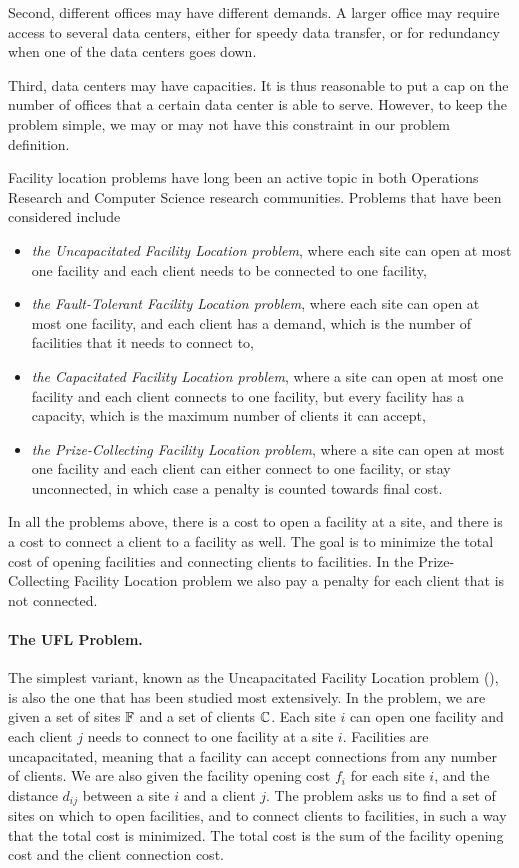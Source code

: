 \documentclass[oneside,final]{ucr}
\begin{document}
Second, different offices may have different demands. A
larger office may require access to several data centers,
either for speedy data transfer, or for redundancy when one
of the data centers goes down.

Third, data centers may have capacities. It is thus
reasonable to put a cap on the number of offices that a
certain data center is able to serve. However, to keep the
problem simple, we may or may not have this constraint in
our problem definition.

Facility location problems have long been an active topic in
both Operations Research and Computer Science research
communities. Problems that have been considered include
\begin{itemize}
\item \emph{the Uncapacitated Facility Location problem}, where
  each site can open at most one facility and each client
  needs to be connected to one facility,
\item \emph{the Fault-Tolerant Facility Location problem},
  where each site can open at most one facility, and each
  client has a demand, which is the number of facilities
  that it needs to connect to,
\item \emph{the Capacitated Facility Location problem},
  where a site can open at most one facility and each client
  connects to one facility, but every facility has a
  capacity, which is the maximum number of clients it can
  accept,
\item \emph{the Prize-Collecting Facility Location problem},
  where a site can open at most one facility and each client
  can either connect to one facility, or stay unconnected,
  in which case a penalty is counted towards final cost.
\end{itemize}
In all the problems above, there is a cost to open a
facility at a site, and there is a cost to connect a client
to a facility as well. The goal is to minimize the total
cost of opening facilities and connecting clients to
facilities. In the Prize-Collecting Facility Location
problem we also pay a penalty for each client that is not
connected.

\paragraph{The UFL Problem.}
The simplest variant, known as the Uncapacitated Facility
Location problem ({\UFL}), is also the one that has been
studied most extensively. In the {\UFL} problem, we are
given a set of sites $\mathbb{F}$ and a set of clients
$\mathbb{C}$. Each site $i$ can open one facility and each
client $j$ needs to connect to one facility at a site
$i$. Facilities are uncapacitated, meaning that a facility
can accept connections from any number of clients. We are
also given the facility opening cost $f_i$ for each site
$i$, and the distance $d_{ij}$ between a site $i$ and a
client $j$. The problem asks us to find a set of sites on
which to open facilities, and to connect clients to
facilities, in such a way that the total cost is
minimized. The total cost is the sum of the facility opening
cost and the client connection cost.
\end{document}

